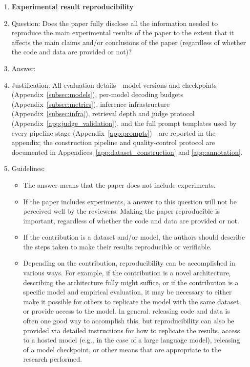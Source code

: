 \documentclass{article}
\begin{document}
\begin{enumerate}
    \item {\bf Experimental result reproducibility}
    \item[] Question: Does the paper fully disclose all the information needed to reproduce the main experimental results of the paper to the extent that it affects the main claims and/or conclusions of the paper (regardless of whether the code and data are provided or not)?
    \item[] Answer: \answerYes{}
    \item[] Justification: All evaluation details---model versions and checkpoints (Appendix~\ref{subsec:models}), per-model decoding budgets (Appendix~\ref{subsec:metrics}), inference infrastructure (Appendix~\ref{subsec:infra}), retrieval depth and judge protocol (Appendix~\ref{app:judge_validation}), and the full prompt templates used by every pipeline stage (Appendix~\ref{app:prompts})---are reported in the appendix; the construction pipeline and quality-control protocol are documented in Appendices~\ref{app:dataset_construction} and \ref{app:annotation}.
    \item[] Guidelines:
    \begin{itemize}
        \item The answer \answerNA{} means that the paper does not include experiments.
        \item If the paper includes experiments, a \answerNo{} answer to this question will not be perceived well by the reviewers: Making the paper reproducible is important, regardless of whether the code and data are provided or not.
        \item If the contribution is a dataset and\slash or model, the authors should describe the steps taken to make their results reproducible or verifiable.
        \item Depending on the contribution, reproducibility can be accomplished in various ways. For example, if the contribution is a novel architecture, describing the architecture fully might suffice, or if the contribution is a specific model and empirical evaluation, it may be necessary to either make it possible for others to replicate the model with the same dataset, or provide access to the model. In general. releasing code and data is often one good way to accomplish this, but reproducibility can also be provided via detailed instructions for how to replicate the results, access to a hosted model (e.g., in the case of a large language model), releasing of a model checkpoint, or other means that are appropriate to the research performed.

\end{itemize}
\end{enumerate}
\end{document}
